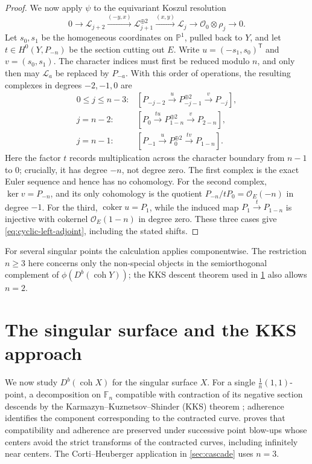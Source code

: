 \documentclass[11pt]{article}
\theoremstyle{plain}
\theoremstyle{definition}
\theoremstyle{remark}
\newcommand{\Pp}{\mathbb P}
\newcommand{\F}{\mathbb F}
\newcommand{\Db}{D^b}
\newcommand{\coh}{\operatorname{coh}}
\newcommand{\OO}{\mathcal O}
\begin{document}
\begin{proof}
We now apply \(\psi\) to the equivariant Koszul resolution
\[
0\longrightarrow\mathcal L_{j+2}
\xrightarrow{(-y,x)}\mathcal L_{j+1}^{\oplus2}
\xrightarrow{(x,y)}\mathcal L_j
\longrightarrow\OO_0\otimes\rho_j\longrightarrow0.
\]
Let \(s_0,s_1\) be the homogeneous coordinates on \(\Pp^1\),
pulled back to \(Y\), and let
\(t\in H^0(Y,P_{-n})\) be the section cutting out \(E\).
Write \(u=(-s_1,s_0)^{\mathsf T}\) and \(v=(s_0,s_1)\).
The character indices must first be reduced modulo \(n\), and only then may
\(\mathcal L_a\) be replaced by \(P_{-a}\). With this order of operations,
the resulting complexes in degrees \(-2,-1,0\) are
\[
\begin{array}{ll}
0\leq j\leq n-3:
 & [P_{-j-2}\xrightarrow{u}P_{-j-1}^{\oplus2}
       \xrightarrow{v}P_{-j}],\\[3pt]
j=n-2:
 & [P_0\xrightarrow{tu}P_{1-n}^{\oplus2}
       \xrightarrow{v}P_{2-n}],\\[3pt]
j=n-1:
 & [P_{-1}\xrightarrow{u}P_0^{\oplus2}
       \xrightarrow{tv}P_{1-n}].
\end{array}
\]
Here the factor \(t\) records multiplication across the character boundary
from \(n-1\) to \(0\); crucially, it has degree \(-n\), not degree zero.
The first complex is the exact Euler sequence and hence has no cohomology.
For the second complex, \(\ker v=P_{-n}\), and its only cohomology is the
quotient \(P_{-n}/tP_0=\OO_E(-n)\) in degree \(-1\). For the third,
\(\operatorname{coker}u=P_1\), while the induced map
\(P_1\xrightarrow{t}P_{1-n}\) is injective with cokernel
\(\OO_E(1-n)\) in degree zero. These three cases give
\eqref{eq:cyclic-left-adjoint}, including the stated shifts.
\end{proof}

For several singular points the calculation applies componentwise.
The restriction \(n\geq3\) here concerns only the non-special objects in the
semiorthogonal complement of \(\phi(\Db(\coh Y))\);
the KKS descent theorem used in \cref{sec:kks} also allows \(n=2\).

\section{The singular surface and the KKS approach}
\label{sec:kks}

We now study \(\Db(\coh X)\) for the singular surface \(X\).
For a single \(\frac1n(1,1)\)-point, a decomposition on \(\F_n\)
compatible with contraction of its negative section descends by the
Karmazyn--Kuznetsov--Shinder (KKS) theorem
\cite[Theorems~2.12 and~3.16]{KKS2020}; adherence identifies the component
corresponding to the contracted curve.
 proves that compatibility and adherence are preserved
under successive point blow-ups whose centers avoid the strict transforms
of the contracted curves, including infinitely near centers. The Corti--Heuberger application in
\cref{sec:cascade} uses \(n=3\).
\end{document}
